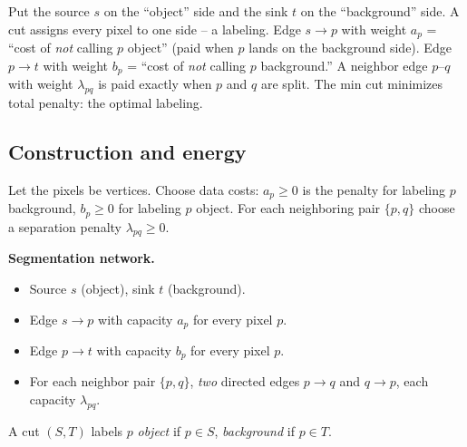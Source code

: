 \begin{intuitionbox}
Put the source $s$ on the ``object'' side and the sink $t$ on the ``background'' side. A cut assigns every pixel to one side -- a labeling. Edge $s\to p$ with weight $a_p$ = ``cost of \emph{not} calling $p$ object'' (paid when $p$ lands on the background side). Edge $p\to t$ with weight $b_p$ = ``cost of \emph{not} calling $p$ background.'' A neighbor edge $p$--$q$ with weight $\lambda_{pq}$ is paid exactly when $p$ and $q$ are split. The min cut minimizes total penalty: the optimal labeling.
\end{intuitionbox}

\subsection{Construction and energy}

Let the pixels be vertices. Choose data costs: $a_p \ge 0$ is the penalty for labeling $p$ background, $b_p \ge 0$ for labeling $p$ object. For each neighboring pair $\{p,q\}$ choose a separation penalty $\lambda_{pq}\ge 0$.

\begin{focusbox}
\textbf{Segmentation network.}
\begin{itemize}
\item Source $s$ (object), sink $t$ (background).
\item Edge $s\to p$ with capacity $a_p$ for every pixel $p$.
\item Edge $p\to t$ with capacity $b_p$ for every pixel $p$.
\item For each neighbor pair $\{p,q\}$, \emph{two} directed edges $p\to q$ and $q\to p$, each capacity $\lambda_{pq}$.
\end{itemize}
A cut $(S,T)$ labels $p$ \emph{object} if $p\in S$, \emph{background} if $p\in T$.
\end{focusbox}

